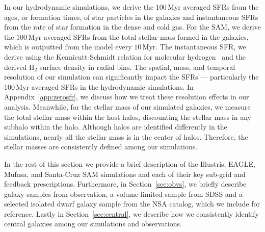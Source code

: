 \documentclass[preprint2,tighten]{aastex62}
\begin{document}
In our hydrodynamic simulations, we derive the $100\,\mathrm{Myr}$ 
averaged SFRs from the ages, or formation times, of star particles 
in the galaxies and instantaneous SFRs from the rate of 
star formation in the dense and cold gas. For the SAM, we derive 
the $100\,\mathrm{Myr}$ averaged SFRs from the total stellar 
mass formed in the galaxies, which is outputted from the model 
every $10\,\mathrm{Myr}$. The instantaneous SFR, we derive using 
the Kennicutt-Schmidt relation for molecular hydrogen~\citep{bigiel2008} 
and the derived H$_2$ surface density in radial bins. The spatial, 
mass, and temporal resolution of our simulation can significantly 
impact the SFRs --- particularly the $100\,\mathrm{Myr}$ averaged 
SFRs in the hydrodynamic simulations. In Appendix~\ref{app:zerosfr}, 
we discuss how we treat these resolution effects in our analysis. 
Meanwhile, for the stellar mass of our simulated galaxies, we 
measure the total stellar mass within the host halos, discounting the 
stellar mass in any subhalo within the halo. Although halos are 
identified differently in the simulations, nearly all the stellar 
mass is in the center of halos. Therefore, the stellar masses are
consistently defined among our simulations.

In the rest of this section we provide a brief description of the 
Illustris, EAGLE, {\sc Mufasa}, and Santa-Cruz SAM simulations and each 
of their key sub-grid and feedback prescriptions. Furthermore, in 
Section~\ref{sec:obvs}, we briefly describe galaxy samples from 
observation, a volume-limited sample from SDSS and a selected isolated 
dwarf galaxy sample from the NSA catalog, which we include for reference.
Lastly in Section~\ref{sec:central}, we describe how we consistently 
identify central galaxies among our simulations and observations. 

\end{document}

